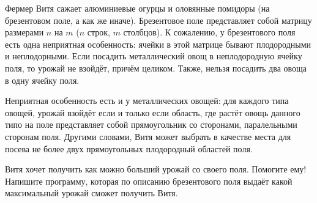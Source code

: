 Фермер Витя сажает алюминиевые огурцы и оловянные помидоры (на брезентовом поле, а как же иначе). Брезентовое поле представляет собой матрицу размерами $n$ на $m$ ($n$ строк, $m$ столбцов). К сожалению, у брезентового поля есть одна неприятная особенность: ячейки в этой матрице бывают плодородными и неплодорными. Если посадить металлический овощ в неплодородную ячейку поля, то урожай не взойдёт, причём целиком. Также, нельзя посадить два овоща в одну ячейку поля.

Неприятная особенность есть и у металлических овощей: для каждого типа овощей, урожай взойдёт если и только если область, где растёт овощь данного типо на поле представляет собой прямоугольник со сторонами, паралельными сторонам поля. Другими словами, Витя может выбрать в качестве места для посева не более двух прямоугольных плодородный областей поля.

Витя хочет получить как можно больший урожай со своего поля. Помогите ему! Напишите программу, которая по описанию брезентового поля выдаёт какой максимальный урожай сможет получить Витя.